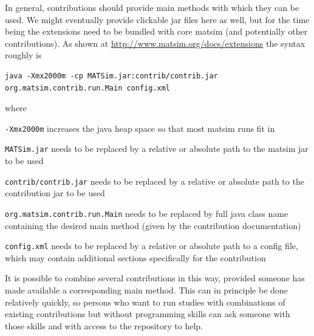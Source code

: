 In general, \glspl{contribution} should provide main methods with which they can be used.  We might eventually provide clickable jar files here as well, but for the time being the extensions need to be bundled with core \gls{matsim} (and potentially other \glspl{contribution}). As shown at \url{http://www.matsim.org/docs/extensions} the syntax roughly is
\begin{lstlisting}
java -Xmx2000m -cp MATSim.jar:contrib/contrib.jar org.matsim.contrib.run.Main config.xml  
\end{lstlisting}
 
where
\begin{compactitem}
\item \lstinline$-Xmx2000m$ increases the \gls{java} heap space so that most \gls{matsim} runs fit in
\item \lstinline$MATSim.jar$ needs to be replaced by a relative or absolute path to the \gls{matsim} jar to be used
\item \lstinline$contrib/contrib.jar$ needs to be replaced by a relative or absolute path to the \gls{contribution} jar to be used
\item \lstinline$org.matsim.contrib.run.Main$ needs to be replaced by full \gls{java} class name containing the desired main method (given by the \gls{contribution} documentation)
\item \lstinline$config.xml$ needs to be replaced by a relative or absolute path to a config file, which may contain additional sections specifically for the \gls{contribution}
\end{compactitem}

It is possible to combine several \glspl{contribution} in this way, provided someone has made available a corresponding main method.  This can in principle be done relatively quickly, so persons who want to run studies with combinations of existing \glspl{contribution} but without programming skills can ask someone with those skills and with access to the repository to help.

